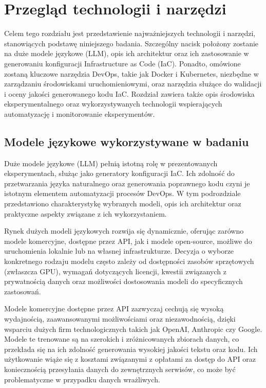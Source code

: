 \clearpage %

\section{Przegląd technologii i narzędzi}

Celem tego rozdziału jest przedstawienie najważniejszych technologii i narzędzi, stanowiących podstawę niniejszego badania. Szczególny nacisk położony zostanie na duże modele językowe (LLM), opis ich architektur oraz ich zastosowanie w generowaniu konfiguracji Infrastructure as Code (IaC). Ponadto, omówione zostaną kluczowe narzędzia DevOps, takie jak Docker i Kubernetes, niezbędne w zarządzaniu środowiskami uruchomieniowymi, oraz narzędzia służące do walidacji i oceny jakości generowanego kodu IaC. Rozdział zawiera także opis środowiska eksperymentalnego oraz wykorzystywanych technologii wspierających automatyzację i monitorowanie eksperymentów.

\subsection{Modele językowe wykorzystywane w badaniu}

Duże modele językowe (LLM) pełnią istotną rolę w prezentowanych eksperymentach, służąc jako generatory konfiguracji IaC. Ich zdolność do przetwarzania języka naturalnego oraz generowania poprawnego kodu czyni je istotnym elementem automatyzacji procesów DevOps. W tym podrozdziale przedstawiono charakterystykę wybranych modeli, opis ich architektur oraz praktyczne aspekty związane z ich wykorzystaniem.

Rynek dużych modeli językowych rozwija się dynamicznie, oferując zarówno modele komercyjne, dostępne przez API, jak i modele open-source, możliwe do uruchomienia lokalnie lub na własnej infrastrukturze. Decyzja o wyborze konkretnego rodzaju modelu często zależy od dostępności zasobów sprzętowych (zwłaszcza GPU), wymagań dotyczących licencji, kwestii związanych z prywatnością danych oraz możliwości dostosowania modeli do specyficznych zastosowań.

Modele komercyjne dostępne przez API zazwyczaj cechują się wysoką wydajnością, zaawansowanymi możliwościami oraz niezawodnością, dzięki wsparciu dużych firm technologicznych takich jak OpenAI, Anthropic czy Google. Modele te trenowane są na szerokich i zróżnicowanych zbiorach danych, co przekłada się na ich zdolność generowania wysokiej jakości tekstu oraz kodu. Ich użytkowanie wiąże się z kosztami związanymi z opłatami za dostęp do API oraz koniecznością przesyłania danych do zewnętrznych serwisów, co może być problematyczne w przypadku danych wrażliwych.


